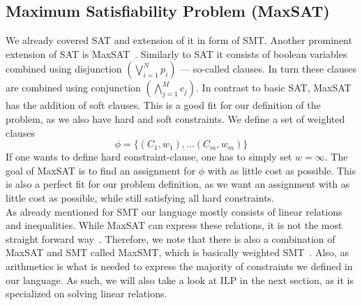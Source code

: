 \subsection{Maximum Satisfiability Problem (MaxSAT)}


We already covered \ac{SAT} and extension of it in form of \ac{SMT}. Another prominent extension of \ac{SAT} is \Ac{MaxSAT}~\cite{bib:2013-ansotegui}. Similarly to \ac{SAT} it consists of boolean variables combined using disjunction $\left( \bigvee_{i=1}^N p_i \right)$ --- so-called clauses. In turn these clauses are combined using conjunction $\left( \bigwedge_{j=1}^M c_j \right)$. In contrast to basic \ac{SAT}, \ac{MaxSAT} has the addition of soft clauses. This is a good fit for our definition of the problem, as we also have hard and soft constraints. We define a set of weighted clauses~\cite{bib:2013-ansotegui}
$$\phi = \{(C_1, w_1), ... (C_m, w_m)\}$$
If one wants to define hard constraint-clause, one has to simply set $w = \infty$.
The goal of \ac{MaxSAT} is to find an assignment for $\phi$ with as little cost as possible.
This is also a perfect fit for our problem definition, as we want an assignment with as little cost as possible, while still satisfying all hard constraints. \\
As already mentioned for \ac{SMT} our language mostly consists of linear relations and inequalities.
While \ac{MaxSAT} can express these relations, it is not the most straight forward way~\cite{bib:2006-nieuwenhuis}.
Therefore, we note that there is also a combination of \ac{MaxSAT} and \ac{SMT} called \Ac{MaxSMT}, which is basically weighted \ac{SMT}~\cite{bib:2016-pasareanu}.
Also, as arithmetics is what is needed to express the majority of constraints we defined in our language. As such, we will also take a look at \ac{ILP} in the next section, as it is specialized on solving linear relations.

